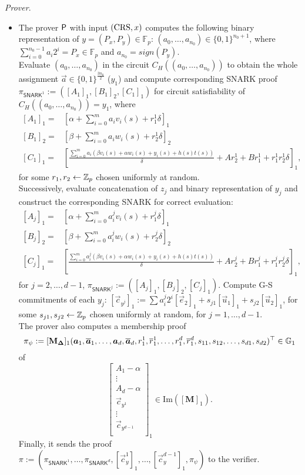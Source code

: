 \noindent \textit{Prover}. 
\begin{itemize}
	\item The prover $\mathsf{P}$ with input $(\textnormal{CRS},x)$ computes the following binary representation of $y= (P_x, P_y) \in \mathbb{F}_p$:
	$(a_{0},\dots,a_{n_0}) \in \{0,1\}^{n_0+1}$, where $\sum_{i=0}^{n_0-1} a_i 2^i=P_x\in \mathbb{F}_p$ and $a_{n_0} = sign(P_y)$.\\
	Evaluate $(a_{0},\dots,a_{n_0})$ in the circuit $C_H((a_{0},\dots,a_{n_0}))$ to obtain the whole assignment $\vec{a}\in \{0,1\}^{\frac{3n_0}{2}}$ ($y_1$) and compute corresponding SNARK proof $\pi_{\textsf{SNARK}^1}:=([A_1]_1,[B_1]_2,[C_1]_1)$ for circuit satisfiability of $C_H((a_0,\dots,a_{n_0}))=y_1$, where
	\[\begin{split}
	[A_1]_1=&\left[\alpha + \sum_{i=0}^m a_i v_i(s) + r_1^1 \delta\right]_1\\
	[B_1]_2 = &\left[\beta + \sum_{i=0}^m a_i w_i(s) + r_2^1 \delta\right]_2\\
	[C_1]_1 = &\left[\frac{\sum_{i=0}^m a_i\left(\beta v_i(s)+\alpha w_i(s)+y_i(s)+h(s)t(s)\right)}{\delta}+Ar_2^1+B r_1^1+ r_1^1r_2^1\delta\right]_1,
	\end{split}\]
	for some $r_1,r_2 \gets \mathbb{Z}_p$ chosen uniformly at random.\\
	Successively, evaluate concatenation of $z_j$ and binary representation of $y_j$ and construct the corresponding SNARK for correct evaluation:
	\[\begin{split}
	[A_j]_1=&\left[\alpha + \sum_{i=0}^m a_i^j v_i(s) + r_1^j \delta\right]_1\\
	[B_j]_2 = &\left[\beta + \sum_{i=0}^m a_i^j w_i(s) + r_2^j \delta\right]_2\\
	[C_j]_1 = &\left[\frac{\sum_{i=0}^m a_i^j\left(\beta v_i(s)+\alpha w_i(s)+y_i(s)+h(s)t(s)\right)}{\delta}+Ar_2^j+B r_1^j+ r_1^jr_2^j\delta\right]_1,
\end{split}\]
	for $j=2,\dots,d-1$, $\pi_{\textsf{SNARK}^j}:=([A_j]_1,[B_j]_2,[C_j]_1)$.
	Compute G-S commitments of each $y_j$: $\left[\vec{c}_{y^j}\right]_1:=\sum a^j_i 2^i [\vec{e}_2]_1+s_{j1}[\vec{u}_1]_1 + s_{j2}[\vec{u}_2]_1$, for some $s_{j1},s_{j2}\gets \mathbb{Z}_p$ chosen uniformly at random, for $j=1,\dots,d-1$.\\
	The prover also computes a membership proof $$\pi_{\psi}:=[\mathbf{M}_{\mathbf{\Delta}}]_1(\vec{a}_1,\overline{\vec{a}}_1,\dots,\vec{a}_d,\overline{\vec{a}}_d,r_1^1,\overline{r}_1^1,\dots,r_1^d,\overline{r}_1^d,s_{11},s_{12},\dots,s_{d1},s_{d2})^{\top}\in \G_1$$ of 
	$$\left[\begin{array}{c}
	A_1-\alpha\\
	\vdots\\
	A_d -\alpha\\
	\vec{c}_{y^1}\\
	\vdots\\
		\vec{c}_{y^{d-1}}\\
	\end{array}\right]_1 \in \text{Im}\left(\left[\mathbf{M}\right]_1\right).$$	
	Finally, it sends the proof $\pi:= \left(\pi_{\textsf{SNARK}^1},\dots,\pi_{\textsf{SNARK}^d},[\vec{c}_y^1]_1,\dots,[\vec{c}_y^{d-1}]_1,\pi_\psi\right)$ to the verifier.
\end{itemize}

